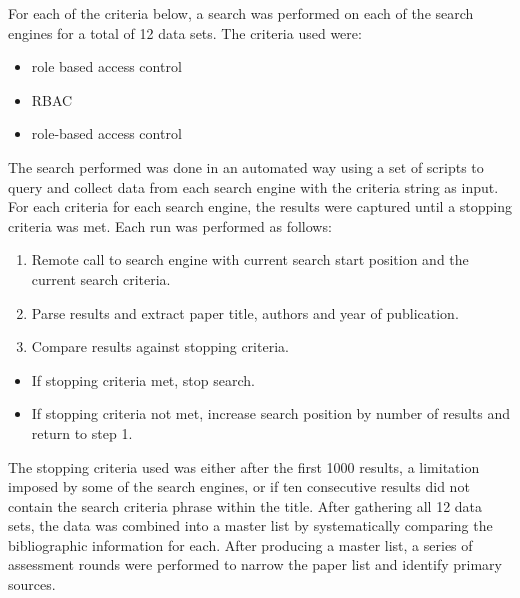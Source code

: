 \documentclass[letterpaper,10pt,english]{sphinxmanual}
\begin{document}
For each of the criteria below, a search was performed on each of the search engines for a total of 12 data sets.  The criteria used were:
\begin{itemize}
\item {} 
role based access control

\item {} 
RBAC

\item {} 
role-based access control

\end{itemize}

The search performed was done in an automated way using a set of scripts to query and collect data from each search engine with the criteria string as input.  For each criteria for each search engine, the results were captured until a stopping criteria was met.  Each run was performed as follows:
\begin{enumerate}
\item {} 
Remote call to search engine with current search start position and the current search criteria.

\item {} 
Parse results and extract paper title, authors and year of publication.

\item {} 
Compare results against stopping criteria.

\end{enumerate}
\begin{itemize}
\item {} 
If stopping criteria met, stop search.

\item {} 
If stopping criteria not met, increase search position by number of results and return to step 1.

\end{itemize}

The stopping criteria used was either after the first 1000 results, a limitation imposed by some of the search engines, or if ten consecutive results did not contain the search criteria phrase within the title.  After gathering all 12 data sets, the data was combined into a master list by systematically comparing the bibliographic information for each.  After producing a master list, a series of assessment rounds were performed to narrow the paper list and identify primary sources.
\end{document}

